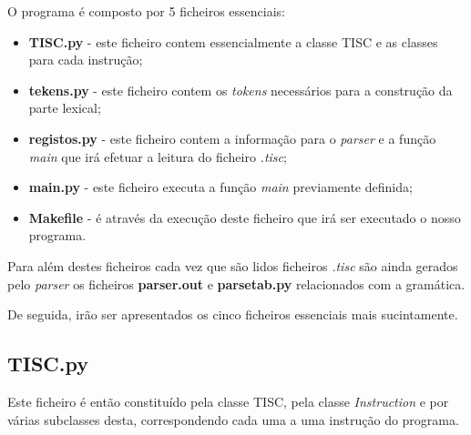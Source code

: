 \documentclass[titlepage,11pt,svgnames]{article}   %
\begin{document}
O programa é composto por 5 ficheiros essenciais:

\begin{itemize}
\item \textbf{TISC.py} - este ficheiro contem essencialmente a classe TISC e as classes para cada instrução;
\item \textbf{tekens.py} - este ficheiro contem os \textit{tokens} necessários para a construção da parte lexical;
\item \textbf{registos.py} - este ficheiro contem a informação para o \textit{parser} e a função \textit{main} que irá efetuar a leitura do ficheiro \textit{.tisc};
\item \textbf{main.py} - este ficheiro executa a função \textit{main} previamente definida;
\item \textbf{Makefile} - é através da execução deste ficheiro que irá ser executado o nosso programa.
\end{itemize}

Para além destes ficheiros cada vez que são lidos ficheiros \textit{.tisc} são ainda gerados pelo \textit{parser} os ficheiros \textbf{parser.out} e \textbf{parsetab.py} relacionados com a gramática.

De seguida, irão ser apresentados os cinco ficheiros essenciais mais sucintamente.

\subsection{TISC.py}

Este ficheiro é então constituído pela classe TISC, pela classe \textit{Instruction} e por várias subclasses desta, correspondendo cada uma a uma instrução do programa.
\end{document}
